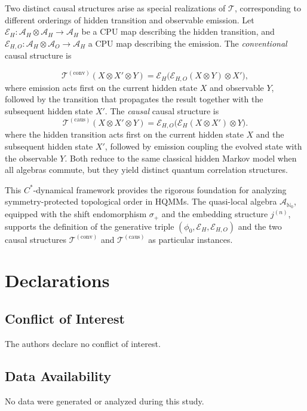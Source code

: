 \documentclass[12pt,a4paper]{article}
\begin{document}
Two distinct causal structures arise as special realizations of $\mathcal{T}$, corresponding to different orderings of hidden transition and observable emission. Let $\mathcal{E}_H: \mathcal{A}_H \otimes \mathcal{A}_H \to \mathcal{A}_H$ be a CPU map describing the hidden transition, and $\mathcal{E}_{H,O}: \mathcal{A}_H \otimes \mathcal{A}_O \to \mathcal{A}_H$ a CPU map describing the emission. The \textit{conventional} causal structure is

\begin{equation}\label{Tconv}
\mathcal{T}^{(\text{conv})}(X \otimes X' \otimes Y) = \mathcal{E}_H\big( \mathcal{E}_{H,O}(X \otimes Y) \otimes X' \big),
\end{equation}
where emission acts first on the current hidden state $X$ and observable $Y$, followed by the transition that propagates the result together with the subsequent hidden state $X'$. The \textit{causal} causal structure is
\begin{equation}\label{Tcaus}
\mathcal{T}^{(\text{caus})}(X \otimes X' \otimes Y) = \mathcal{E}_{H,O}\big( \mathcal{E}_H(X \otimes X') \otimes Y \big).
\end{equation}
where the hidden transition acts first on the current hidden state $X$ and the subsequent hidden state $X'$, followed by emission coupling the evolved state with the observable $Y$. Both reduce to the same classical hidden Markov model when all algebras commute, but they yield distinct quantum correlation structures.

This $C^*$-dynamical framework provides the rigorous foundation for analyzing symmetry-protected topological order in HQMMs. The quasi-local algebra $\mathcal{A}_{\mathbb{N}_0}$, equipped with the shift endomorphism $\sigma_+$ and the embedding structure $j^{(n)}$, supports the definition of the generative triple $(\phi_0, \mathcal{E}_H, \mathcal{E}_{H,O})$ and the two causal structures $\mathcal{T}^{(\text{conv})}$ and $\mathcal{T}^{(\text{caus})}$ as particular instances.


\section*{Declarations}

\subsection*{Conflict of Interest}
The authors declare no conflict of interest.

\subsection*{Data Availability}
No data were generated or analyzed during this study.
\end{document}
